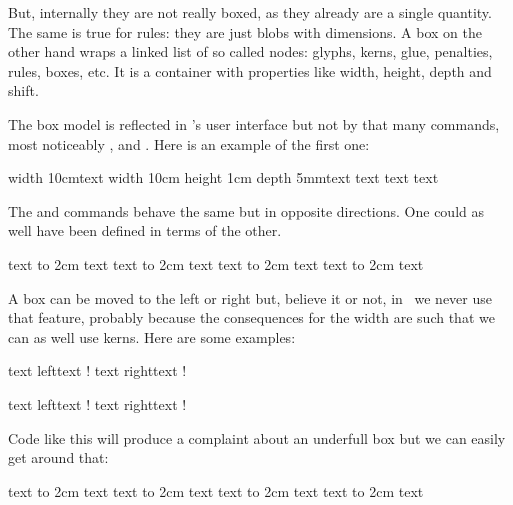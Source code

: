 But, internally they are not really boxed, as they already are a single quantity.
The same is true for rules: they are just blobs with dimensions. A box on the
other hand wraps a linked list of so called nodes: glyphs, kerns, glue,
penalties, rules, boxes, etc. It is a container with properties like width,
height, depth and shift.

\stopsectionlevel

\startsectionlevel[title={\TEX\ primitives}]

The box model is reflected in \TEX's user interface but not by that many
commands, most noticeably \type {\hbox}, \type {\vbox} and \type {\vtop}. Here is
an example of the first one:

\starttyping[option=TEX]
\hbox width 10cm{text}
\hbox width 10cm height 1cm depth 5mm{text}
text \hbox{text} text
\stoptyping

The \type {\raise} and \type {\lower} commands behave the same but in opposite
directions. One could as well have been defined in terms of the other.

\startbuffer
text \raise  5mm \hbox to 2cm {text}
text \lower -5mm \hbox to 2cm {text}
text \raise -5mm \hbox to 2cm {text}
text \lower  5mm \hbox to 2cm {text}
\stopbuffer

\typebuffer[option=TEX]

\startlinecorrection
{\dontcomplain\showboxes\getbuffer}
\stoplinecorrection

A box can be moved to the left or right but, believe it or not, in \CONTEXT\ we
never use that feature, probably because the consequences for the width are such
that we can as well use kerns. Here are some examples:

\startbuffer
text \vbox{\moveleft  5mm \hbox {left}}text !
text \vbox{\moveright 5mm \hbox{right}}text !
\stopbuffer

\typebuffer[option=TEX]

\startlinecorrection
{\dontcomplain\getbuffer}
\stoplinecorrection

\startbuffer
text \vbox{\moveleft  25mm \hbox {left}}text !
text \vbox{\moveright 25mm \hbox{right}}text !
\stopbuffer

\typebuffer[option=TEX]

\startlinecorrection
{\dontcomplain\getbuffer}
\stoplinecorrection

Code like this will produce a complaint about an underfull box but we can easily
get around that:

\startbuffer
text \raise  5mm \hbox to 2cm {\hss text}
text \lower -5mm \hbox to 2cm {text\hss}
text \raise -5mm \hbox to 2cm {\hss text}
text \lower  5mm \hbox to 2cm {text\hss}
\stopbuffer

